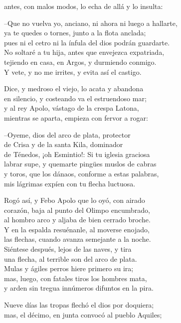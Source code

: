 \documentclass[11pt,twoside]{article}
\begin{document}
antes, con malos modos, lo echa de allá y lo insulta:\par
--Que no vuelva yo, anciano, ni ahora ni luego a hallarte,\\
ya te quedes o tornes, junto a la flota anclada;\\
pues ni el cetro ni la ínfula del dios podrán guardarte.\\
No soltaré a tu hija, antes que envejezca expatriada,\\
tejiendo en casa, en Argos, y durmiendo conmigo.\\
Y vete, y no me irrites, y evita así el castigo.\par
Dice, y medroso el viejo, lo acata y abandona\\
en silencio, y costeando va el estruendoso mar;\\
y al rey Apolo, vástago de la crespa Latona,\\
mientras se aparta, empieza con fervor a rogar:\par
--Oyeme, dios del arco de plata, protector\\
de Crisa y de la santa Kila, dominador\\
de Ténedos, ¡oh Esmintio!: Si tu iglesia graciosa\\
labrar supe, y quemarte pingües muslos de cabras\\
y toros, que los dánaos, conforme a estas palabras,\\
mis lágrimas expíen con tu flecha luctuosa.\par
Rogó así, y Febo Apolo que lo oyó, con airado\\
corazón, baja al punto del Olimpo encumbrado,\\
al hombro arco y aljaba de bien cerrado broche.\\
Y en la espalda resuénanle, al moverse enojado,\\
las flechas, cuando avanza semejante a la noche.\\
Siéntese después, lejos de las naves, y tira\\
una flecha, al terrible son del arco de plata.\\
Mulas y ágiles perros hiere primero su ira;\\
mas, luego, con fatales tiros los hombres mata,\\
y arden sin tregua innúmeros difuntos en la pira.\par
Nueve días las tropas flechó el dios por doquiera;\\
mas, el décimo, en junta convocó al pueblo Aquiles;\\
\end{document}
